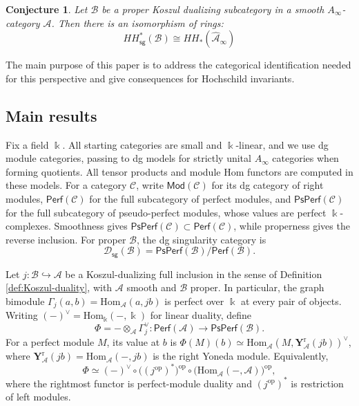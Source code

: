 \documentclass[11pt,letterpaper,reqno]{amsart}
\theoremstyle{plain}
\newtheorem{conjecture}[conjecture]{Conjecture}
\theoremstyle{definition}
\theoremstyle{plain}
\theoremstyle{definition}
\numberwithin{equation}{section}
\begin{document}
\begin{conjecture}\label{conjecture:Takeda}
Let $\mathscr{B}$ be a proper Koszul dualizing subcategory in a smooth $A_\infty$-category $\mathscr{A}$. Then there is an isomorphism of rings:
\[
HH_{\mathsf{sg}}^*(\mathscr{B})\cong HH_*(\widehat{\mathscr{A}}_{\infty}) 
\]
\end{conjecture}

The main purpose of this paper is to address the categorical identification needed for this perspective and give consequences for Hochschild invariants.

\subsection{Main results}

Fix a field $\Bbbk$.
All starting categories are small and $\Bbbk$-linear, and we use dg module categories, passing to dg models for strictly unital $A_\infty$ categories when forming quotients.
All tensor products and module Hom functors are computed in these models.
For a category $\mathscr C$, write $\mathsf{Mod}(\mathscr C)$ for its dg category of right modules, $\mathsf{Perf}(\mathscr C)$ for the full subcategory of perfect modules, and $\mathsf{PsPerf}(\mathscr C)$ for the full subcategory of pseudo-perfect modules, whose values are perfect $\Bbbk$-complexes.
Smoothness gives $\mathsf{PsPerf}(\mathscr C)\subset\mathsf{Perf}(\mathscr C)$, while properness gives the reverse inclusion.
For proper $\mathscr B$, the dg singularity category is
\[
\mathscr D_{\mathsf{sg}}(\mathscr B)
=\mathsf{PsPerf}(\mathscr B)/\mathsf{Perf}(\mathscr B).
\]

Let $j:\mathscr B\hookrightarrow\mathscr A$ be a Koszul-dualizing full inclusion in the sense of Definition \ref{def:Koszul-duality}, with $\mathscr A$ smooth and $\mathscr B$ proper.
In particular, the graph bimodule $\Gamma_j(a,b)=\mathrm{Hom}_{\mathscr A}(a,jb)$ is perfect over $\Bbbk$ at every pair of objects.
Writing $(-)^\vee=\mathrm{Hom}_{\Bbbk}(-,\Bbbk)$ for linear duality, define
\begin{equation}\label{eq:compare-functor}
\Phi=-\otimes_{\mathscr A}\Gamma_j^\vee:
\mathsf{Perf}(\mathscr A)\longrightarrow\mathsf{PsPerf}(\mathscr B).
\end{equation}
For a perfect module $M$, its value at $b$ is $\Phi(M)(b)\simeq\mathrm{Hom}_{\mathscr A}(M,\mathbf Y_{\mathscr A}^{\mathrm r}(jb))^\vee$, where $\mathbf Y_{\mathscr A}^{\mathrm r}(jb)=\mathrm{Hom}_{\mathscr A}(-,jb)$ is the right Yoneda module.
Equivalently,
\begin{equation}\label{eq:compare-functor-Hom-form}
\Phi\simeq(-)^\vee\circ\bigl((j^{\mathrm{op}})^*\bigr)^{\mathrm{op}}
\circ\bigl(\mathrm{Hom}_{\mathscr A}(-,\mathscr A)\bigr)^{\mathrm{op}},
\end{equation}
where the rightmost functor is perfect-module duality and $(j^{\mathrm{op}})^*$ is restriction of left modules.
\end{document}
